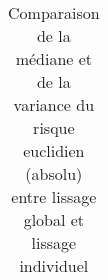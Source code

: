 \begin{table}[H]
\begin{tabularx}{\textwidth}{ccccXXXX}
        \bottomrule
    \end{tabularx}
    \caption{Comparaison de la médiane et de la variance du risque euclidien (absolu) entre lissage global et lissage individuel}
    \label{tab:couple_1323_indiv_vs_glob}
    \end{table}
    
